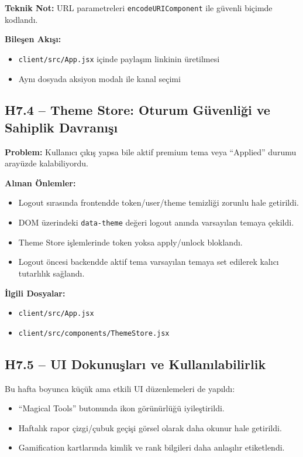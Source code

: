 \documentclass[12pt,a4paper]{article}
\begin{document}
\textbf{Teknik Not:} URL parametreleri \texttt{encodeURIComponent} ile güvenli biçimde kodlandı.

\textbf{Bileşen Akışı:}
\begin{itemize}[leftmargin=*]
  \item \texttt{client/src/App.jsx} içinde paylaşım linkinin üretilmesi
  \item Aynı dosyada aksiyon modalı ile kanal seçimi
\end{itemize}

\subsection{H7.4 -- Theme Store: Oturum Güvenliği ve Sahiplik Davranışı}

\textbf{Problem:} Kullanıcı çıkış yapsa bile aktif premium tema veya ``Applied'' durumu arayüzde kalabiliyordu.

\textbf{Alınan Önlemler:}
\begin{itemize}[leftmargin=*]
  \item Logout sırasında frontendde token/user/theme temizliği zorunlu hale getirildi.
  \item DOM üzerindeki \texttt{data-theme} değeri logout anında varsayılan temaya çekildi.
  \item Theme Store işlemlerinde token yoksa apply/unlock bloklandı.
  \item Logout öncesi backendde aktif tema varsayılan temaya set edilerek kalıcı tutarlılık sağlandı.
\end{itemize}

\textbf{İlgili Dosyalar:}
\begin{itemize}[leftmargin=*]
  \item \texttt{client/src/App.jsx}
  \item \texttt{client/src/components/ThemeStore.jsx}
\end{itemize}

\subsection{H7.5 -- UI Dokunuşları ve Kullanılabilirlik}

Bu hafta boyunca küçük ama etkili UI düzenlemeleri de yapıldı:
\begin{itemize}[leftmargin=*]
  \item ``Magical Tools'' butonunda ikon görünürlüğü iyileştirildi.
  \item Haftalık rapor çizgi/çubuk geçişi görsel olarak daha okunur hale getirildi.
  \item Gamification kartlarında kimlik ve rank bilgileri daha anlaşılır etiketlendi.
\end{itemize}
\end{document}
